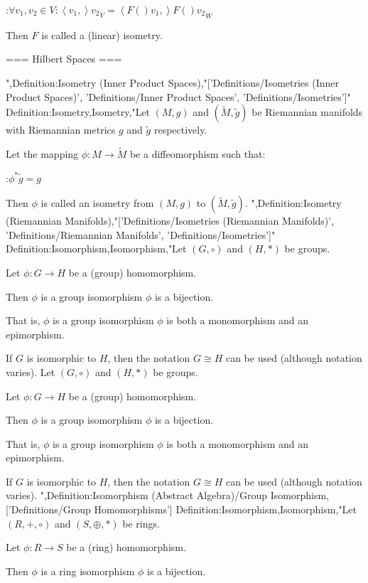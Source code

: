 :$\forall v_1, v_2 \in V : \left\langle v_1,   \right\rangle{v_2}_V = \left\langle F \left(   \right){v_1},   \right\rangle{F \left(   \right){v_2}}_W$


Then $F$ is called a (linear) isometry.


=== Hilbert Spaces ===

",Definition:Isometry (Inner Product Spaces),"['Definitions/Isometries (Inner Product Spaces)', 'Definitions/Inner Product Spaces', 'Definitions/Isometries']"
Definition:Isometry,Isometry,"Let $\left( M, g \right)$ and $\left( \tilde M, \tilde g \right)$ be Riemannian manifolds with Riemannian metrics $g$ and $\tilde g$ respectively.

Let the mapping $\phi : M \to \tilde M$ be a diffeomorphism such that:

:$\phi^* \tilde g = g$


Then $\phi$ is called an isometry from $\left( M, g \right)$ to $\left( \tilde M, \tilde g \right)$.
",Definition:Isometry (Riemannian Manifolds),"['Definitions/Isometries (Riemannian Manifolds)', 'Definitions/Riemannian Manifolds', 'Definitions/Isometries']"
Definition:Isomorphism,Isomorphism,"Let $\left( G, \circ \right)$ and $\left( H, * \right)$ be groups.

Let $\phi: G \to H$ be a (group) homomorphism.


Then $\phi$ is a group isomorphism  $\phi$ is a bijection.


That is, $\phi$ is a group isomorphism  $\phi$ is both a monomorphism and an epimorphism.


If $G$ is isomorphic to $H$, then the notation $G \cong H$ can be used (although notation varies).
Let $\left( G, \circ \right)$ and $\left( H, * \right)$ be groups.

Let $\phi: G \to H$ be a (group) homomorphism.


Then $\phi$ is a group isomorphism  $\phi$ is a bijection.


That is, $\phi$ is a group isomorphism  $\phi$ is both a monomorphism and an epimorphism.


If $G$ is isomorphic to $H$, then the notation $G \cong H$ can be used (although notation varies).
",Definition:Isomorphism (Abstract Algebra)/Group Isomorphism,['Definitions/Group Homomorphisms']
Definition:Isomorphism,Isomorphism,"Let $\left( R, +, \circ \right)$ and $\left( S, \oplus, * \right)$ be rings.

Let $\phi: R \to S$ be a (ring) homomorphism.


Then $\phi$ is a ring isomorphism  $\phi$ is a bijection.

